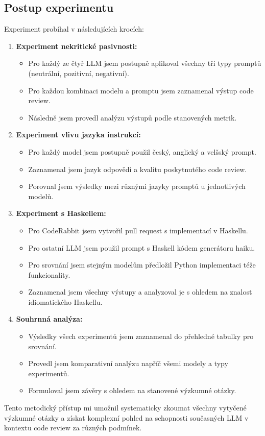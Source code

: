 \documentclass[12pt, a4paper]{article}
\begin{document}
\subsection{Postup experimentu}
Experiment probíhal v následujících krocích:
\begin{enumerate}
\item \textbf{Experiment nekritické pasivnosti:}
\begin{itemize}
\item Pro každý ze čtyř LLM jsem postupně aplikoval všechny tři typy promptů (neutrální, pozitivní, negativní).
\item Pro každou kombinaci modelu a promptu jsem zaznamenal výstup code review.
\item Následně jsem provedl analýzu výstupů podle stanovených metrik.
\end{itemize}
\item \textbf{Experiment vlivu jazyka instrukcí:}
\begin{itemize}
\item Pro každý model jsem postupně použil český, anglický a velšský prompt.
\item Zaznamenal jsem jazyk odpovědi a kvalitu poskytnutého code review.
\item Porovnal jsem výsledky mezi různými jazyky promptů u jednotlivých modelů.
\end{itemize}
\item \textbf{Experiment s Haskellem:}
\begin{itemize}
\item Pro CodeRabbit jsem vytvořil pull request s implementací v Haskellu.
\item Pro ostatní LLM jsem použil prompt s Haskell kódem generátoru haiku.
\item Pro srovnání jsem stejným modelům předložil Python implementaci téže funkcionality.
\item Zaznamenal jsem všechny výstupy a analyzoval je s ohledem na znalost idiomatického Haskellu.
\end{itemize}
\item \textbf{Souhrnná analýza:}
\begin{itemize}
\item Výsledky všech experimentů jsem zaznamenal do přehledné tabulky pro srovnání.
\item Provedl jsem komparativní analýzu napříč všemi modely a typy experimentů.
\item Formuloval jsem závěry s ohledem na stanovené výzkumné otázky.
\end{itemize}
\end{enumerate}
Tento metodický přístup mi umožnil systematicky zkoumat všechny vytyčené výzkumné otázky a získat komplexní pohled na schopnosti současných LLM v kontextu code review za různých podmínek.
\end{document}
